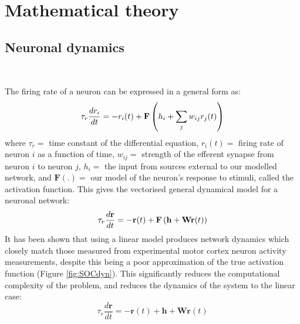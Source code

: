 \documentclass[12pt, a4paper]{article}
\begin{document}
\pagebreak
\section{Mathematical theory}
\label{sec:mathTh}


\subsection{Neuronal dynamics}‎

\noindent The firing rate of a neuron can be expressed in a general form as:
    \begin{equation} \tau_r \frac{dr_i}{dt} = -r_i(t) + \text{\bf{F}}\left( h_i + \sum_j w_{ij}r_j(t)\right)      \end{equation}
where $\tau_r =$ time constant of the differential equation, $r_i(t) = $ firing rate of neuron $i$ as a function of time, $w_{ij} = $ strength of the efferent synapse from neuron $i$ to neuron $j$, $h_i = $ the input from sources external to our modelled network, and $\textbf{F}(.) = $ our model of the neuron's response to stimuli, called the activation function.  This gives the vectorised general dynamical model for a neuronal network:
    \begin{equation} \tau_r \frac{d\mathbf{r}}{dt} = -\mathbf{r}(t) + \text{\bf{F}}\left( \mathbf{h} + \mathbf{W r}(t) \right)     \end{equation}
It has been shown that using a linear model produces network dynamics which closely match those measured from experimental motor cortex neuron activity measurements\cite{HennequinSubmitted}, despite this being a poor approximation of the true activation function (Figure \ref{fig:SOCdyn}).  This significantly reduces the computational complexity of the problem, and reduces the dynamics of the system to the linear case:
    \begin{equation} \tau_r \frac{d\mathbf{r}}{dt} = -\mathbf{r}(t) + \mathbf{h} + \mathbf{W r}(t)     \label{eqn:dynamics} \end{equation}
    
\end{document}
